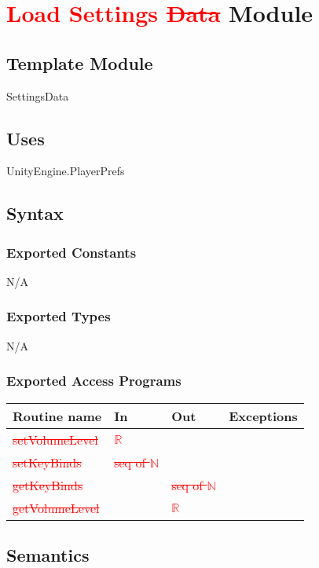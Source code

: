 \documentclass[12pt]{article}
\begin{document}
\section {\textcolor{red}{Load Settings \sout{Data}} Module}

\subsection{Template Module}
SettingsData

\subsection {Uses}
UnityEngine.PlayerPrefs

\subsection {Syntax}

\subsubsection {Exported Constants}
N/A
\subsubsection {Exported Types}
N/A
\subsubsection {Exported Access Programs}

\begin{tabular}{| l | l | l | l |}
\hline
\textbf{Routine name} & \textbf{In} & \textbf{Out} & \textbf{Exceptions}\\
\hline
\textcolor{red}{\sout{setVolumeLevel}}    &  \textcolor{red}{\sout{$\mathbb{R}$}}         &           &          \\
\hline
\textcolor{red}{\sout{setKeyBinds}}       &  \textcolor{red}{\sout{seq of $\mathbb{N}$}}     &           &          \\
\hline
\textcolor{red}{\sout{getKeyBinds}}       &           &      \textcolor{red}{\sout{seq of $\mathbb{N}$}}     &          \\
\hline
\textcolor{red}{\sout{getVolumeLevel}}       &           &    \textcolor{red}{\sout{$\mathbb{R}$}}       &           \\
\hline
\end{tabular}

\subsection {Semantics}
\end{document}
